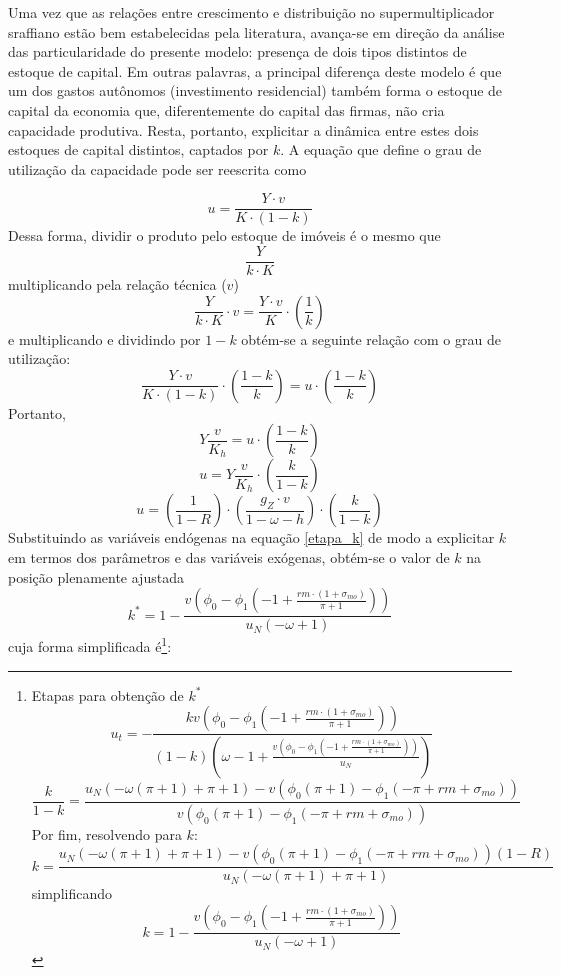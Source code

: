 Uma vez que as relações entre crescimento e distribuição no supermultiplicador sraffiano estão bem estabelecidas pela literatura, avança-se em direção da análise das particularidade do presente modelo: presença de dois tipos distintos de estoque de capital.
Em outras palavras, a principal diferença deste modelo é que um dos gastos autônomos (investimento residencial) também forma o estoque de capital da economia que, diferentemente do capital das firmas, não cria capacidade produtiva. Resta, portanto, explicitar a dinâmica entre estes dois estoques de capital distintos, captados por $k$. A equação que define o grau de utilização da capacidade pode ser reescrita como

$$
u = \frac{Y\cdot v}{K \cdot (1-k)}
$$
Dessa forma, dividir o produto pelo estoque de imóveis é o mesmo que
$$
\frac{Y}{k\cdot K}
$$
multiplicando pela relação técnica ($v$)
$$
\frac{Y}{k\cdot K}\cdot v = \frac{Y\cdot v}{K}\cdot \left(\frac{1}{k}\right)
$$
e multiplicando e dividindo por $1-k$ obtém-se a seguinte relação com o grau de utilização:
$$
\frac{Y\cdot v}{K\cdot (1-k)}\cdot \left(\frac{1-k}{k}\right) = u \cdot \left(\frac{1-k}{k}\right)
$$
Portanto,
$$
Y\frac{v}{K_h} =  u \cdot \left(\frac{1-k}{k}\right)
$$
$$
u = Y\frac{v}{K_h} \cdot \left(\frac{k}{1-k}\right)
$$
\begin{equation}
\label{etapa_k}
u = \left(\frac{1}{1-R}\right)\cdot\left(\frac{g_Z\cdot v}{1-\omega- h}\right)\cdot\left(\frac{k}{1-k}\right)
\end{equation}
Substituindo as variáveis endógenas na equação \ref{etapa_k} de modo a explicitar $k$ em termos dos parâmetros e  das variáveis exógenas, obtém-se o valor de $k$ na posição plenamente ajustada
\begin{equation}
\label{kAnali}
k^* = 1 - \frac{v \left(\phi_{0} - \phi_{1} \left(-1 + \frac{rm\cdot(1+\sigma_{mo})}{\pi + 1}\right)\right)}{u_N \left(- \omega + 1\right)}
\end{equation}
cuja forma simplificada é\footnote{Etapas para obtenção de $k^*$
	$$
	u_t = - \frac{k v \left(\phi_{0} - \phi_{1} \left(-1 + \frac{rm\cdot(1+\sigma_{mo})}{\pi + 1}\right)\right)}{\left(1 - k\right) \left(\omega - 1 + \frac{v \left(\phi_{0} - \phi_{1} \left(-1 + \frac{rm\cdot(1+\sigma_{mo})}{\pi + 1}\right)\right)}{u_N}\right)}
	$$
	$$
	\frac{k}{1 - k} = \frac{u_N \left(- \omega \left(\pi + 1\right) + \pi + 1\right) - v \left(\phi_{0} \left(\pi + 1\right) - \phi_{1} \left(- \pi + rm + \sigma_{mo}\right)\right)}{v \left(\phi_{0} \left(\pi + 1\right) - \phi_{1} \left(- \pi + rm + \sigma_{mo}\right)\right)}
	$$
	Por fim, resolvendo para $k$:
	$$
	k = \frac{u_N \left(- \omega \left(\pi + 1\right) + \pi + 1\right) - v \left(\phi_{0} \left(\pi + 1\right) - \phi_{1} \left(- \pi + rm + \sigma_{mo}\right)\right)(1-R)}{u_N \left(- \omega \left(\pi + 1\right) + \pi + 1\right)}
	$$
simplificando
$$
k = 1 - \frac{v \left(\phi_{0} - \phi_{1} \left(-1 + \frac{rm\cdot(1+\sigma_{mo})}{\pi + 1}\right)\right)}{u_N \left(- \omega + 1\right)}
$$
}:
